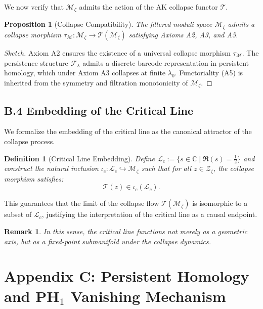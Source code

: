 \documentclass[11pt]{article}
\newtheorem{definition}[theorem]{Definition}
\newtheorem{proposition}[theorem]{Proposition}
\newtheorem{remark}[theorem]{Remark}
\begin{document}
We now verify that $\mathcal{M}_\zeta$ admits the action of the AK collapse functor $\mathcal{T}$.

\begin{proposition}[Collapse Compatibility]
The filtered moduli space $\mathcal{M}_\zeta$ admits a collapse morphism $\tau_{\mathcal{M}} : \mathcal{M}_\zeta \to \mathcal{T}(\mathcal{M}_\zeta)$  
satisfying Axioms A2, A3, and A5.
\end{proposition}

\begin{proof}[Sketch]
Axiom A2 ensures the existence of a universal collapse morphism $\tau_{\mathcal{M}}$.  
The persistence structure $\mathcal{F}_\lambda$ admits a discrete barcode representation in persistent homology,  
which under Axiom A3 collapses at finite $\lambda_0$.  
Functoriality (A5) is inherited from the symmetry and filtration monotonicity of $\mathcal{M}_\zeta$.
\end{proof}

\subsection*{B.4 Embedding of the Critical Line}

We formalize the embedding of the critical line as the canonical attractor of the collapse process.

\begin{definition}[Critical Line Embedding]
Define $\mathcal{L}_c := \{ s \in \mathbb{C} \mid \Re(s) = \tfrac{1}{2} \}$ and  
construct the natural inclusion $\iota_c : \mathcal{L}_c \hookrightarrow \mathcal{M}_\zeta$  
such that for all $z \in \mathcal{Z}_\zeta$, the collapse morphism satisfies:
\[
\mathcal{T}(z) \in \iota_c(\mathcal{L}_c).
\]
\end{definition}

This guarantees that the limit of the collapse flow $\mathcal{T}(\mathcal{M}_\zeta)$  
is isomorphic to a subset of $\mathcal{L}_c$, justifying the interpretation of the critical line as a causal endpoint.

\begin{remark}
In this sense, the critical line functions not merely as a geometric axis, but as a fixed-point submanifold under the collapse dynamics.
\end{remark}



\section*{Appendix C: Persistent Homology and PH$_1$ Vanishing Mechanism}
\end{document}
